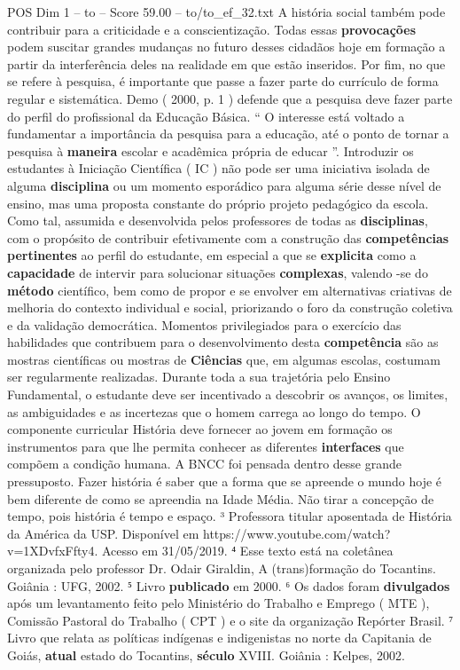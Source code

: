 \begin{textsample}{POS Dim 1 – to – Score 59.00 – to/to\_ef\_32.txt}
A história social também pode contribuir para a criticidade e a conscientização.
Todas essas \textbf{provocações} podem suscitar grandes mudanças no futuro desses cidadãos hoje em formação a partir da interferência deles na realidade em que estão inseridos.
Por fim, no que se refere à pesquisa, é importante que passe a fazer parte do currículo de forma regular e sistemática.
Demo ( 2000, p. 1 ) defende que a pesquisa deve fazer parte do perfil do profissional da Educação Básica. “ O interesse está voltado a fundamentar a importância da pesquisa para a educação, até o ponto de tornar a pesquisa à \textbf{maneira} escolar e acadêmica própria de educar ”.
Introduzir os estudantes à Iniciação Científica ( IC ) não pode ser uma iniciativa isolada de alguma \textbf{disciplina} ou um momento esporádico para alguma série desse nível de ensino, mas uma proposta constante do próprio projeto pedagógico da escola.
Como tal, assumida e desenvolvida pelos professores de todas as \textbf{disciplinas}, com o propósito de contribuir efetivamente com a construção das \textbf{competências} \textbf{pertinentes} ao perfil do estudante, em especial a que se \textbf{explicita} como a \textbf{capacidade} de intervir para solucionar situações \textbf{complexas}, valendo -se do \textbf{método} científico, bem como de propor e se envolver em alternativas criativas de melhoria do contexto individual e social, priorizando o foro da construção coletiva e da validação democrática.
Momentos privilegiados para o exercício das habilidades que contribuem para o desenvolvimento desta \textbf{competência} são as mostras científicas ou mostras de \textbf{Ciências} que, em algumas escolas, costumam ser regularmente realizadas.
Durante toda a sua trajetória pelo Ensino Fundamental, o estudante deve ser incentivado a descobrir os avanços, os limites, as ambiguidades e as incertezas que o homem carrega ao longo do tempo.
O componente curricular História deve fornecer ao jovem em formação os instrumentos para que lhe permita conhecer as diferentes \textbf{interfaces} que compõem a condição humana.
A BNCC foi pensada dentro desse grande pressuposto.
Fazer história é saber que a forma que se apreende o mundo hoje é bem diferente de como se apreendia na Idade Média.
Não tirar a concepção de tempo, pois história é tempo e espaço. ³ Professora titular aposentada de História da América da USP.
Disponível em https://www.youtube.com/watch? v=1XDvfxFfty4.
Acesso em 31/05/2019. ⁴ Esse texto está na coletânea organizada pelo professor Dr.
Odair Giraldin, A (trans)formação do Tocantins.
Goiânia : UFG, 2002. ⁵ Livro \textbf{publicado} em 2000. ⁶ Os dados foram \textbf{divulgados} após um levantamento feito pelo Ministério do Trabalho e Emprego ( MTE ), Comissão Pastoral do Trabalho ( CPT ) e o site da organização Repórter Brasil. ⁷ Livro que relata as políticas indígenas e indigenistas no norte da Capitania de Goiás, \textbf{atual} estado do Tocantins, \textbf{século} XVIII.
Goiânia : Kelpes, 2002.


\end{textsample}
